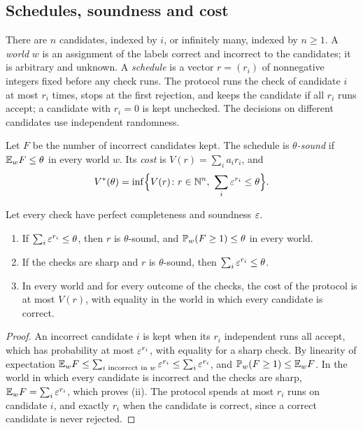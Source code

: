 \subsection{Schedules, soundness and cost}

There are $n$ candidates, indexed by $i$, or infinitely many, indexed by $n\ge1$. A \emph{world} $w$ is an assignment of the labels correct and incorrect to the candidates; it is arbitrary and unknown. A \emph{schedule} is a vector $r=(r_{i})$ of nonnegative integers fixed before any check runs. The protocol runs the check of candidate $i$ at most $r_{i}$ times, stops at the first rejection, and keeps the candidate if all $r_{i}$ runs accept; a candidate with $r_{i}=0$ is kept unchecked. The decisions on different candidates use independent randomness.

\begin{definition}\label{def:sound}
Let $F$ be the number of incorrect candidates kept. The schedule is \emph{$\theta$-sound} if $\mathbb{E}_{w}F\le\theta$ in every world $w$. Its \emph{cost} is $V(r)=\sum_{i}a_{i}r_{i}$, and
\[
V^{*}(\theta)=\inf\Bigl\{V(r)\colon r\in\mathbb{N}^{n},\ \sum_{i}\varepsilon^{r_{i}}\le\theta\Bigr\}.
\]
\end{definition}

\begin{lemma}\label{lem:sound}
Let every check have perfect completeness and soundness $\varepsilon$.
\begin{enumerate}[label=\textup{(\roman*)},leftmargin=2.2em,itemsep=1pt]
\item If $\sum_{i}\varepsilon^{r_{i}}\le\theta$, then $r$ is $\theta$-sound, and $\mathbb{P}_{w}(F\ge1)\le\theta$ in every world.
\item If the checks are sharp and $r$ is $\theta$-sound, then $\sum_{i}\varepsilon^{r_{i}}\le\theta$.
\item In every world and for every outcome of the checks, the cost of the protocol is at most $V(r)$, with equality in the world in which every candidate is correct.
\end{enumerate}
\end{lemma}

\begin{proof}
An incorrect candidate $i$ is kept when its $r_{i}$ independent runs all accept, which has probability at most $\varepsilon^{r_{i}}$, with equality for a sharp check. By linearity of expectation $\mathbb{E}_{w}F\le\sum_{i\text{ incorrect in }w}\varepsilon^{r_{i}}\le\sum_{i}\varepsilon^{r_{i}}$, and $\mathbb{P}_{w}(F\ge1)\le\mathbb{E}_{w}F$. In the world in which every candidate is incorrect and the checks are sharp, $\mathbb{E}_{w}F=\sum_{i}\varepsilon^{r_{i}}$, which proves (ii). The protocol spends at most $r_{i}$ runs on candidate $i$, and exactly $r_{i}$ when the candidate is correct, since a correct candidate is never rejected.
\end{proof}

